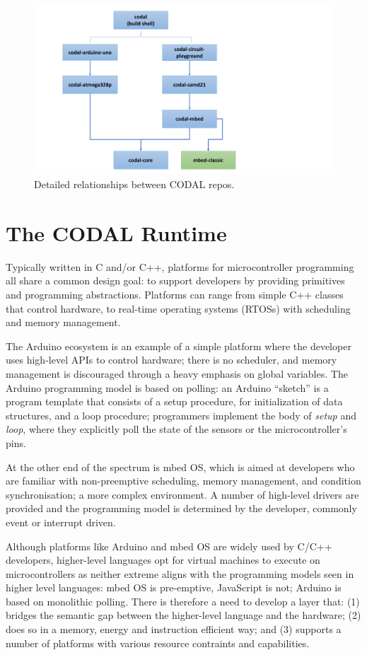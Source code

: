 \begin{figure}[t]
    \includegraphics[width=4.5in]{codalFig.pdf}
    \caption{\label{fig:codal}Detailed relationships between CODAL repos.}
\end{figure}

\section{The CODAL Runtime}
\label{sec:codal}

Typically written in C and/or C++, platforms for microcontroller programming all share a common design goal: to support developers by providing primitives and programming abstractions. Platforms can range from simple C++ classes that control hardware, to real-time operating systems (RTOSs) with scheduling and memory management.

The Arduino ecosystem is an example of a simple platform where the developer uses high-level APIs to control hardware; there is no scheduler, and memory management is discouraged through a heavy emphasis on global variables.  The Arduino programming model is based on polling: an Arduino ``sketch'' is a program template that consists of a setup procedure, for initialization of data structures, and a loop procedure; programmers implement the body of \textit{setup} and \textit{loop}, where they explicitly poll the state of the sensors or the microcontroller's pins.

At the other end of the spectrum is mbed OS, which is aimed at developers who are familiar with non-preemptive scheduling, memory management, and condition synchronisation; a more complex environment. A number of high-level drivers are provided and the programming model is determined by the developer, commonly event or interrupt driven.

Although platforms like Arduino and mbed OS are widely used by C/C++ developers, higher-level languages opt for virtual machines to execute on microcontrollers as neither extreme aligns with the programming models seen in higher level languages: mbed OS is pre-emptive, JavaScript is not; Arduino is based on monolithic polling. There is therefore a need to develop a layer that: (1) bridges the semantic gap between the higher-level language and the hardware; (2) does so in a memory, energy and instruction efficient way; and (3) supports a number of platforms with various resource contraints and capabilities.

